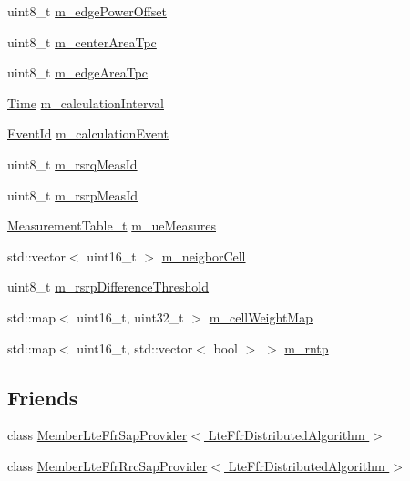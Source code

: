 \begin{DoxyCompactItemize}
\item 
uint8\+\_\+t \hyperlink{classns3_1_1LteFfrDistributedAlgorithm_a6b076816f4079872f6579792a790b531}{m\+\_\+edge\+Power\+Offset}
\item 
uint8\+\_\+t \hyperlink{classns3_1_1LteFfrDistributedAlgorithm_a7bcda9d730ee5d3b9c890e099b62105c}{m\+\_\+center\+Area\+Tpc}
\item 
uint8\+\_\+t \hyperlink{classns3_1_1LteFfrDistributedAlgorithm_a60316c96f055b50b4a1295f373df6c1d}{m\+\_\+edge\+Area\+Tpc}
\item 
\hyperlink{classns3_1_1Time}{Time} \hyperlink{classns3_1_1LteFfrDistributedAlgorithm_a404a92a46615776b6fb6c1b761ec1535}{m\+\_\+calculation\+Interval}
\item 
\hyperlink{classns3_1_1EventId}{Event\+Id} \hyperlink{classns3_1_1LteFfrDistributedAlgorithm_aab8a5406f687e44ab76540dd43e12da9}{m\+\_\+calculation\+Event}
\item 
uint8\+\_\+t \hyperlink{classns3_1_1LteFfrDistributedAlgorithm_a62723bbd0b2db2380e7b274ed31a3533}{m\+\_\+rsrq\+Meas\+Id}
\item 
uint8\+\_\+t \hyperlink{classns3_1_1LteFfrDistributedAlgorithm_a35021a38b8371dca09c296e4755ddfeb}{m\+\_\+rsrp\+Meas\+Id}
\item 
\hyperlink{classns3_1_1LteFfrDistributedAlgorithm_ac46f79cc3cbb206c7cc80447f7f73a1b}{Measurement\+Table\+\_\+t} \hyperlink{classns3_1_1LteFfrDistributedAlgorithm_a7c74c81039a56db450fc726ab9d26d2c}{m\+\_\+ue\+Measures}
\item 
std\+::vector$<$ uint16\+\_\+t $>$ \hyperlink{classns3_1_1LteFfrDistributedAlgorithm_a824ee5482f34a9ce23948de09981103f}{m\+\_\+neigbor\+Cell}
\item 
uint8\+\_\+t \hyperlink{classns3_1_1LteFfrDistributedAlgorithm_a32f38a14793a97940c6467d520ad3279}{m\+\_\+rsrp\+Difference\+Threshold}
\item 
std\+::map$<$ uint16\+\_\+t, uint32\+\_\+t $>$ \hyperlink{classns3_1_1LteFfrDistributedAlgorithm_a4593a94dcf488909ef6c7d8f1fe6b394}{m\+\_\+cell\+Weight\+Map}
\item 
std\+::map$<$ uint16\+\_\+t, std\+::vector$<$ bool $>$ $>$ \hyperlink{classns3_1_1LteFfrDistributedAlgorithm_a24568f688fc2284efa197c3679ae0d8d}{m\+\_\+rntp}
\end{DoxyCompactItemize}
\subsection*{Friends}
\begin{DoxyCompactItemize}
\item 
class \hyperlink{classns3_1_1LteFfrDistributedAlgorithm_a4b5a5fd10990ac3a59f3dd08fcecd2c1}{Member\+Lte\+Ffr\+Sap\+Provider$<$ Lte\+Ffr\+Distributed\+Algorithm $>$}
\item 
class \hyperlink{classns3_1_1LteFfrDistributedAlgorithm_a8bcf44070e7fb43987d130af7c8eb2e0}{Member\+Lte\+Ffr\+Rrc\+Sap\+Provider$<$ Lte\+Ffr\+Distributed\+Algorithm $>$}
\end{DoxyCompactItemize}
